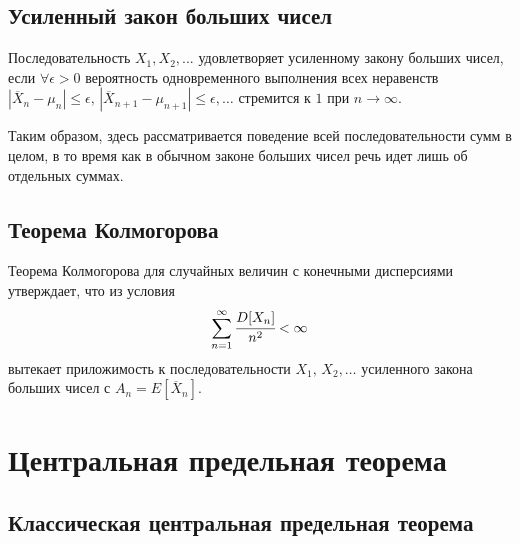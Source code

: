 \documentclass{article}
\begin{document}
\subsection{Усиленный закон больших чисел}
Последовательность ${ X_{1},X_{2},...}$ удовлетворяет усиленному закону больших чисел, если $\forall \epsilon >0$ вероятность одновременного выполнения всех неравенств $|\overline{X}_n-\mu_n|\leq\epsilon,\,|\overline{X}_{n+1}-\mu_{n+1}|\leq\epsilon,\dots$ стремится к $1$ при $n\to\infty$.

Таким образом, здесь рассматривается поведение всей последовательности сумм в целом, в то время как в обычном законе больших чисел речь идет лишь об отдельных суммах.

\subsection{Теорема Колмогорова}
Теорема Колмогорова для случайных величин с конечными дисперсиями утверждает, что из условия
$$ \sum_{n=1}^{\infty} \cfrac{D[X_n]}{n^2}<\infty $$
вытекает приложимость к последовательности $X_1,\,X_2,\dots$ усиленного закона больших чисел с $A_n=E[\overline{X}_n]$.
\newpage
\section{Центральная предельная теорема}
\subsection{Классическая центральная предельная теорема}
\end{document}
